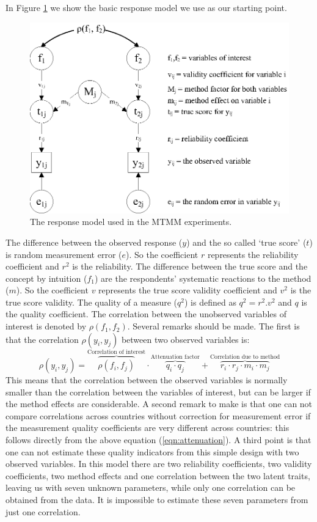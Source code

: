 \documentclass[a4paper,12pt]{article}
\begin{document}
In Figure \ref{fig:response} we show the basic response model \cite{Saris_design_2007} we use as our starting point. 

\begin{figure}[htb]
\centering
\includegraphics[width=.7\textwidth]{response_model.eps}
\caption{The response model used in the MTMM experiments.\label{fig:response}}
\end{figure}

The difference between the observed response ($y$) and the so called `true score' ($t$) is random measurement error ($e$). So the coefficient $r$ represents the reliability coefficient and $r^2$ is the reliability.
The difference between the true score and the concept by intuition ($f_1$) are the respondents' systematic reactions to the method ($m$). So the coefficient $v$ represents the true score validity coefficient and $v^2$ is the true score validity. The quality of a measure ($q^2$) is defined as  $q^2 =  r^2 . v^2$ and $q$ is the quality coefficient. The correlation between the unobserved variables of interest is denoted by $\rho(f_1,f_2)$.
Several remarks should be made. The first is that the correlation $\rho(y_i, y_j)$ between two observed variables is:
\begin{equation}
\rho(y_i, y_j) = \overbrace{\rho(f_i, f_j)}^{\textrm{Correlation of interest}} \cdot \overbrace{q_i \cdot q_j}^{\textrm{Attenuation factor}} + \overbrace{r_i \cdot r_j \cdot m_i \cdot m_j}^{\textrm{Correlation due to method}}
\label{eqn:attenuation}\end{equation}
This means that the correlation between the observed variables is normally smaller than the correlation between the variables of interest, but can be larger if the method effects are considerable. A second remark to make is that one can not compare correlations across countries without correction for measurement error if the measurement quality coefficients are very different across countries: this follows directly from the above equation (\ref{eqn:attenuation}). A third point is that one can not estimate these quality indicators from this simple design with two observed variables. In this model there are two reliability coefficients, two validity coefficients, two method effects and one correlation between the two latent traits, leaving us with seven unknown parameters, while only one correlation can be obtained from the data. It is impossible to estimate these seven parameters from just one correlation.  
\end{document}
